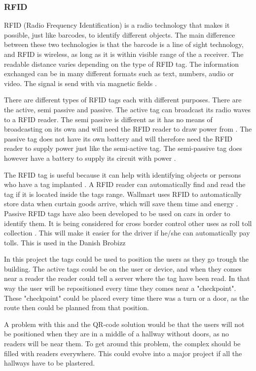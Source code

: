 \subsubsection{RFID}

RFID (Radio Frequency Identification) is a radio technology that makes it possible, just like barcodes, to identify different objects. The main difference between these two technologies is that the barcode is a line of sight technology, and RFID is wireless, as long as it is within visible range of the a receiver. The readable distance varies depending on the type of RFID tag. The information exchanged can be in many different formats such as text, numbers, audio or video. The signal is send with via magnetic fields \cite{RFID_magnetic}.

There are different types of RFID tags each with different purposes. There are the active, semi passive and passive. The active tag can broadcast its radio waves to a RFID reader. The semi passive is different as it has no means of broadcasting on its own and will need the RFID reader to draw power from \cite{RFID_semiActive}. The passive tag does not have its own battery and will therefore need the RFID reader to supply power just like the semi-active tag. The semi-passive tag does however have a battery to supply its circuit with power \cite{RFID_AllTypes}.

The RFID tag is useful because it can help with identifying objects or persons who have a tag implanted \cite{RFID_FAQ}. A RFID reader can automatically find and read the tag if it is located inside the tags range. Wallmart uses RFID to automatically store data when curtain goods arrive, which will save them time and energy \cite{RFiD_inc}. Passive RFID tags have also been developed to be used on cars in order to identify them. It is being considered for cross border control other uses as roll toll collection \cite{RFID_car}. This will make it easier for the driver if he/she can automatically pay tolls. This is used in the Danish Brobizz \cite{RFID_brobizz}   

In this project the tags could be used to position the users as they go trough the building. The active tags could be on the user or device, and when they comes near a reader the reader could tell a server where the tag have been read. In that way the user will be repositioned every time they comes near a "checkpoint". These "checkpoint" could be placed every time there was a turn or a door, as the route then could be planned from that position.

A problem with this and the QR-code solution would be that the users will not be positioned when they are in a middle of a hallway without doors, as no readers will be near them. To get around this problem, the complex should be filled with readers everywhere. This could evolve into a major project if all the hallways have to be plastered.

